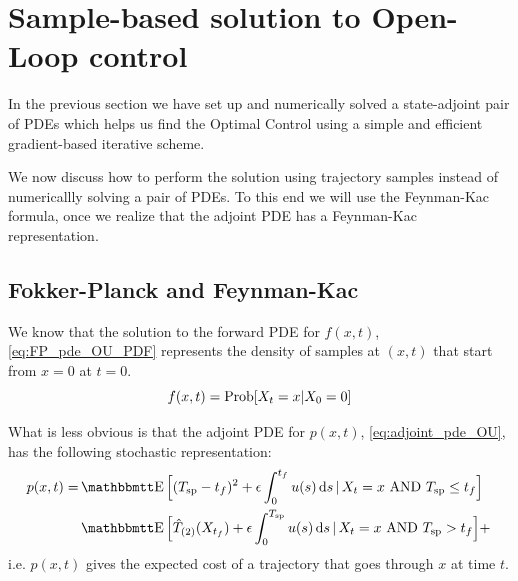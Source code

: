 \documentclass{article}
\begin{document}
\newpage

\section{Sample-based solution to Open-Loop control}
In the previous section we have set up and numerically solved a
state-adjoint pair of PDEs which helps us find the Optimal Control using
a simple and efficient gradient-based iterative scheme.

We now discuss how to perform the solution using trajectory samples instead of
numericallly solving a pair of PDEs. To this end we will use the Feynman-Kac
formula, once we realize that the adjoint PDE has a Feynman-Kac representation.  

\subsection{Fokker-Planck and Feynman-Kac}
We know that the solution to the forward PDE for $f(x,t)$,
\cref{eq:FP_pde_OU_PDF} represents the density of samples at $(x,t)$
that start from $x=0$ at $t= 0$. 
$$
f(x,t) = \operatorname{Prob}[ X_t = x| X_0 = 0]
$$

What is less obvious is that the adjoint PDE
for $p(x,t)$, \cref{eq:adjoint_pde_OU}, has the following stochastic
representation:
\begin{align}
p(x,t) =&
	\Exp\Big[(\ts - \tf)^2 + \e\int_0^\tf u(s) \intd{s} \,|\, X_t = x \text{
	AND } \ts \leq \tf \Big] \notag
\\ 	\,	&
	\Exp \Big[\Ttwo(X_\tf) + \e\int_0^\ts u(s) \intd{s} \,|\, X_t = x \text{ AND }
	\ts> \tf \Big] +\,
\label{eq:adjoint_FeynmanKac_representation}
\end{align}
i.e. $p(x,t)$ gives the expected cost of a trajectory that goes through $x$ at
time $t$.
\end{document}
